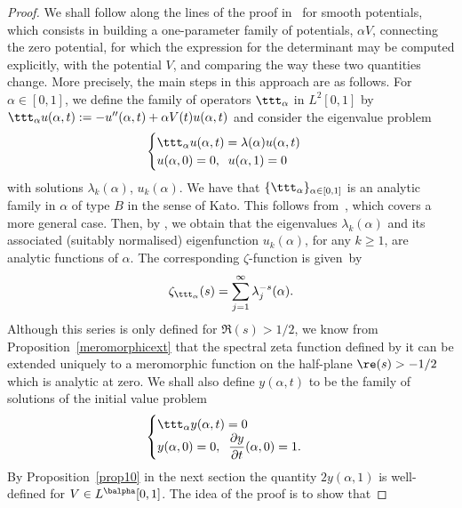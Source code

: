 \begin{proof}
We shall follow along the lines of the proof in~\cite[Th.\,1]{Levit-Smilansky} for smooth potentials,
which consists in building a one-parameter family of potentials, $\alpha V$, connecting the zero potential,
for which the expression for the determinant may be computed explicitly, with the potential $V$, and comparing
the way these two quantities change.
More precisely, the main steps in this approach are as follows. For $\alpha\in [0,1]$, we define the family of
operators $\ttt_{\alpha}$ in $L^{2}[0,1]$ by $\ttt_{\alpha} u(\alpha, t) := -u''(\alpha,t) + \alpha V(t) u(\alpha,t)$
and consider the eigenvalue problem
\begin{equation}\label{eigprob}
\begin{cases}
\ttt_{\alpha} u(\alpha, t)=\lambda(\alpha) u(\alpha,t)\\
u(\alpha,0)=0, \;\; u(\alpha,1)=0
\end{cases}
\end{equation}
with solutions $\lambda_k(\alpha)$, $u_k(\alpha)$.
We have that $\{\ttt_{\alpha}\}_{\alpha\in [0,1]}$ is an analytic
family in $\alpha$ of type $B$ in the sense of Kato. This follows from~\cite[Ex.\,VII.4.24]{Kato}, which covers a more general case. Then, by \cite[Rem.\,VII.4.22 \& Th.\,VII.3.9]{Kato}, we obtain that the eigenvalues $\lambda_k(\alpha)$ and its associated (suitably normalised) eigenfunction $u_k(\alpha)$, for any
$k\geq 1$, are analytic functions of $\alpha$.
The corresponding $\zeta$-function is given~by
\begin{equation}\label{zetaalpha}
\zeta_{\ttt_{\alpha}}(s) = \sum_{j=1}^{\infty} \lambda_{j}^{-s}(\alpha).
\end{equation}
Although this series is only defined for $\Re(s)>1/2$, we know from Proposition~\ref{meromorphicext} that the spectral zeta function defined by it
can be extended uniquely to a meromorphic function on the half-plane $\re(s)>-1/2$ which is analytic at zero.
We shall also define $y(\alpha,t)$ to be the family of solutions of the initial value problem
\begin{equation*}
\begin{cases}
\ttt_{\alpha} y(\alpha,t)=0\\
y(\alpha,0)=0, \;\; \dfrac{\partial y}{\partial t}(\alpha, 0)=1.
\end{cases}
\end{equation*}
By Proposition~\ref{prop10} in the next section the quantity $2y(\alpha,1)$ is well-defined for $V \in L^{\balpha}[0,1]$.
The idea of the proof is to show that

\end{proof}

